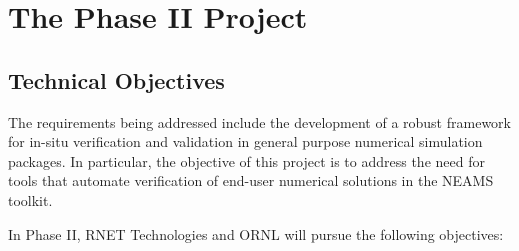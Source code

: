 
\section{The Phase II Project}
\label{sec:phaseII}


\subsection{Technical Objectives}

The requirements being addressed include the development of a robust framework 
for in-situ verification and validation in general purpose numerical simulation 
packages. In particular, the objective of this project is to address the need
for tools that automate verification of end-user numerical solutions in the 
NEAMS toolkit. 

In Phase II, RNET Technologies and ORNL will pursue the following objectives:

